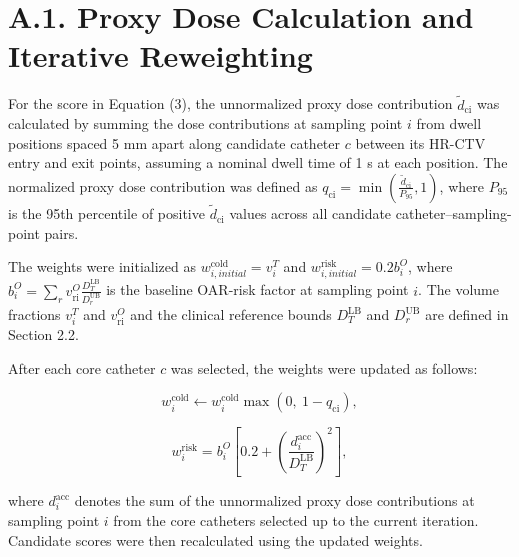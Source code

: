 \documentclass[12pt,twoside,letterpaper]{article}
\begin{document}
\raggedbottom


\linenumbers

\section*{A.1. Proxy Dose Calculation and Iterative Reweighting}

For the score in Equation (3), the unnormalized proxy dose contribution ${\widetilde{d}}_{\text{ci}}$ was calculated by summing the dose contributions at sampling point $i$ from dwell positions spaced 5 mm apart along candidate catheter $c$ between its HR-CTV entry and exit points, assuming a nominal dwell time of 1 s at each position. The normalized proxy dose contribution was defined as $q_{\text{ci}} = \min\left( \frac{{\widetilde{d}}_{\text{ci}}}{P_{95}},1 \right)$, where $P_{95}$ is the 95th percentile of positive ${\widetilde{d}}_{\text{ci}}$ values across all candidate catheter--sampling-point pairs.

The weights were initialized as $w_{i,initial}^{\text{cold}} = v_{i}^{T}$ and $w_{i,initial}^{\text{risk}} = 0.2b_{i}^{O}$, where $b_{i}^{O} = \sum_{r}^{}v_{\text{ri}}^{O}\frac{D_{T}^{\text{LB}}}{D_{r}^{\text{UB}}}$ is the baseline OAR-risk factor at sampling point $i$. The volume fractions $v_{i}^{T}$ and $v_{\text{ri}}^{O}$ and the clinical reference bounds $D_{T}^{\text{LB}}$ and $D_{r}^{\text{UB}}$ are defined in Section 2.2.

After each core catheter $c$ was selected, the weights were updated as follows:

\begin{equation}\tag{A1}w_{i}^{\text{cold}} \leftarrow w_{i}^{\text{cold}}\max\left( 0,\ 1 - q_{\text{ci}} \right),\end{equation}

\begin{equation}\tag{A2}w_{i}^{\text{risk}} = b_{i}^{O}\left\lbrack 0.2 + \left( \frac{d_{i}^{\text{acc}}}{D_{T}^{\text{LB}}} \right)^{2} \right\rbrack,\end{equation}

where $d_{i}^{\text{acc}}$ denotes the sum of the unnormalized proxy dose contributions at sampling point $i$ from the core catheters selected up to the current iteration. Candidate scores were then recalculated using the updated weights.
\end{document}

